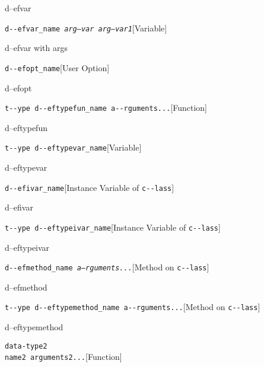 \documentclass{book}
\begin{document}
%
d--efvar

\noindent\texttt{d{-}{-}efvar\_name \EmbracOn{}\textnormal{\textsl{arg--var arg--var1}}\EmbracOff{}}\hfill[Variable]



%
d--efvar with args

\noindent\texttt{d{-}{-}efopt\_name}\hfill[User Option]



%
d--efopt

\noindent\texttt{t{-}{-}ype d{-}{-}eftypefun\_name a{-}{-}rguments...}\hfill[Function]



%
d--eftypefun

\noindent\texttt{t{-}{-}ype d{-}{-}eftypevar\_name}\hfill[Variable]



%
d--eftypevar

\noindent\texttt{d{-}{-}efivar\_name}\hfill[Instance Variable of \texttt{c{-}{-}lass}]



%
d--efivar

\noindent\texttt{t{-}{-}ype d{-}{-}eftypeivar\_name}\hfill[Instance Variable of \texttt{c{-}{-}lass}]



%
d--eftypeivar

\noindent\texttt{d{-}{-}efmethod\_name \EmbracOn{}\textnormal{\textsl{a--rguments...}}\EmbracOff{}}\hfill[Method on \texttt{c{-}{-}lass}]



%
d--efmethod

\noindent\texttt{t{-}{-}ype d{-}{-}eftypemethod\_name a{-}{-}rguments...}\hfill[Method on \texttt{c{-}{-}lass}]



%
d--eftypemethod


\noindent\texttt{data-type2\leavevmode{}\\name2 arguments2...}\hfill[Function]
\end{document}
